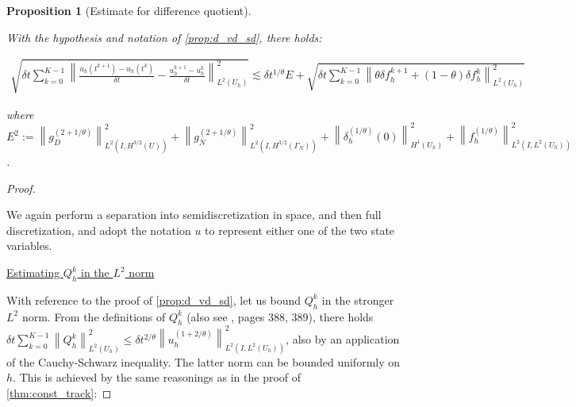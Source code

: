 \documentclass[english,a4paper,9pt,oneside]{scrbook}	%
\theoremstyle{break}
\newtheorem{prop}[equation]{Proposition}
\newenvironment{mproof}[1][\proofname]{%
  \begin{proof}[#1]$ $\par\nobreak\ignorespaces
}{%
  \end{proof}
}
\renewcommand*{\proofname}{Proof}
\theoremstyle{remark}
\newcommand{\ds}{\displaystyle}
\newcommand{\norm}[1]{\left\lVert#1\right\rVert}
\newcommand{\te}{\theta}
\begin{document}
\begin{appendices}




\begin{prop}[Estimate for difference quotient]
\label{prop:another_bound}

With the hypothesis and notation of  \cref{prop:d_vd_sd}, there holds:


\begin{align*}
	\sqrt{\delta t \sum_{k=0}^{K-1} \norm{\frac{u_h(t^{k+1})-u_h(t^k)}{\delta t} - \frac{u_h^{k+1}-u_h^{k}}{\delta t}}_{L^2(U_h)}^2}\lesssim \delta t^{1/\te}E +  \sqrt{\delta t \sum_{k=0}^{K-1}\norm{\theta \delta f_h^{k+1}+(1-\theta)\delta f_h^k}_{L^2(U_h)}^2}
\end{align*}

where $\ds E^2:=\norm{g_D^{(2+1/\te)}}_{L^2(I,{H^{3/2}(U)})}^2 + \norm{g_{N}^{(2+1/\te)}}_{L^2(I,{H^{3/2}(\Gamma_{N})})}^2 +\norm{\delta_h^{(1/\te)}(0)}_{H^1(U_h)}^2 + \norm{f_h^{(1/\te)}}^2_{L^2(I,L^2(U_h))}$.
\end{prop}

\begin{mproof}
We again perform a separation into semidiscretization in space, and then full discretization, and adopt the notation $u$ to represent either one of the two state variables.

\underline{Estimating $Q_h^k$ in the $L^2$ norm}

With reference to the proof of \cref{prop:d_vd_sd}, let us bound $Q_h^k$ in the stronger $L^2$ norm. From the definitions of $Q_h^k$ (also see \cite{quarteroni}, pages 388, 389), there holds $\delta t \sum_{k=0}^{K-1} \norm{Q_h^k}_{L^2(U_h)}^2\leq \delta t^{2/\te} \norm{u_h^{(1+2/\te)}}_{L^2(I,{L^2(U_h)})}^2$, also by an application of the Cauchy-Schwarz inequality. The latter norm can be bounded uniformly on $h$. This is achieved by the same reasonings as in the proof of \cref{thm:const_track}:


\end{mproof}
\end{appendices}
\end{document}
